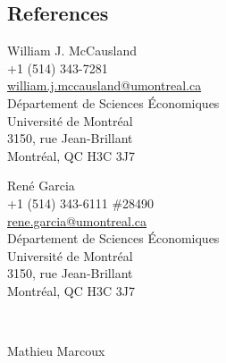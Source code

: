 \documentclass[margin,line]{res}
\begin{document}
\begin{resume}
\section{\sc References}
\vspace{.075in}
\begin{minipage}{0.45\resumewidth}
  William J. McCausland                                                                   \\
  +1 (514) 343-7281                                                                       \\
  \href{mailto:william.j.mccausland@umontreal.ca}{william.j.mccausland@umontreal.ca}      \\
  D\'epartement de Sciences \'Economiques                                                 \\
  Universit\'e de Montr\'eal                                                              \\
  3150, rue Jean-Brillant                                                                 \\
  Montr\'eal, QC  H3C 3J7                                                                 \\
\end{minipage}
\begin{minipage}{0.45\resumewidth}
  Ren\'e Garcia                                                                           \\
  +1 (514) 343-6111 \#28490                                                               \\
  \href{mailto:rene.garcia@umontreal.ca}{rene.garcia@umontreal.ca}                        \\
  D\'epartement de Sciences \'Economiques                                                 \\
  Universit\'e de Montr\'eal                                                              \\
  3150, rue Jean-Brillant                                                                 \\
  Montr\'eal, QC  H3C 3J7                                                                 \\
\end{minipage}
\vspace{0.2in} \\
\begin{minipage}{0.45\resumewidth}
  Mathieu Marcoux                                                                         \\

\end{minipage}
\end{resume}
\end{document}
